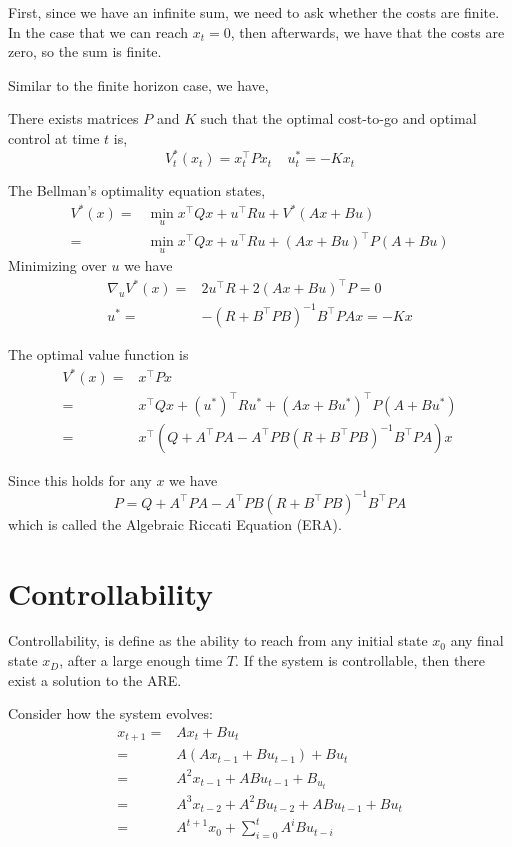 First, since we have an infinite sum, we need to ask whether the
costs are finite. In the case that we can reach $x_t=0$, then
afterwards, we have that the costs are zero, so the sum is finite.

Similar to the finite horizon case, we have,
\begin{theorem}
There exists matrices $P$ and $K$ such that the optimal cost-to-go
and optimal control at time $t$ is,
\[
V^*_t(x_t)=x_t^\top P x_t \;\;\;\; u_t^*=-K x_t
\]
\end{theorem}

The Bellman's optimality equation states,
\begin{align*}
V^*(x)=& \min_u  x^\top Qx + u^\top Ru+V^*(Ax+Bu)\\
=& \min_u  x^\top Qx + u^\top Ru+(Ax+Bu)^\top P(A+Bu)
\end{align*}
Minimizing over $u$ we have
\begin{align*}
\nabla_u V^*(x)=&  2 u^\top R+2(Ax+Bu)^\top P=0\\
u^*=& -(R+B^\top PB)^{-1}B^\top PAx=-Kx
\end{align*}

The optimal value function is
\begin{align*}
V^*(x)=& x^\top Px\\
=& x^\top Qx + (u^*)^\top Ru^*+(Ax+Bu^*)^\top P(A+Bu^*)\\
=& x^\top (Q+A^\top P A - A^\top P B(R+B^\top P B)^{-1} B^\top P A)x
\end{align*}

Since this holds for any $x$ we have
\[
P=Q+A^\top P A - A^\top P B(R+B^\top P B)^{-1} B^\top P A
\]
which is called the Algebraic Riccati Equation (ERA).


\section{Controllability}

Controllability, is define as the ability to reach from any initial
state $x_0$ any final state $x_D$, after a large enough time $T$. If
the system is controllable, then there exist a solution to the ARE.

Consider how the system evolves:
\begin{align*}
x_{t+1}=& Ax_t+Bu_t\\
=& A(Ax_{t-1}+Bu_{t-1})+Bu_t\\
=&A^2x_{t-1}+ABu_{t-1}+B_{u_t}\\
=& A^3 x_{t-2}+A^2B u_{t-2}+AB u_{t-1}+Bu_t\\
=&A^{t+1} x_0+\sum_{i=0}^{t} A^i B u _{t-i}
\end{align*}

